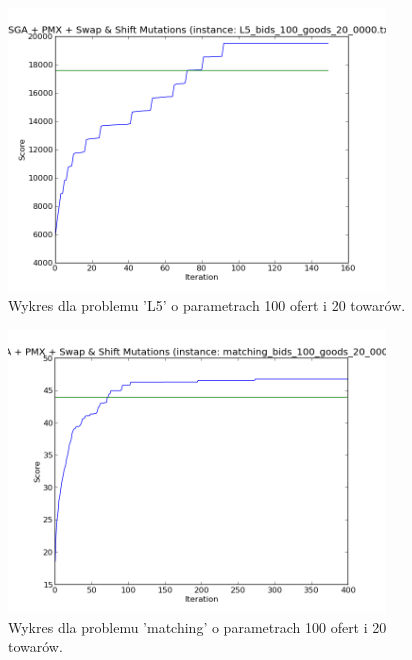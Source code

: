 \begin{figure}[!ht]
    \centering
    \includegraphics[width=10cm]{wykresy/L5_bids_100_goods_20_0000_txt_1.png}
    \caption{Wykres dla problemu 'L5' o parametrach 100 ofert i 20 towarów.}
    \label{wyk:sga3}
\end{figure}

\begin{figure}[!ht]
    \centering
    \includegraphics[width=10cm]{wykresy/matching_bids_100_goods_20_0000_txt_uniq.png}
    \caption{Wykres dla problemu 'matching' o parametrach 100 ofert i 20 towarów.}
    \label{wyk:sga4}
\end{figure}


